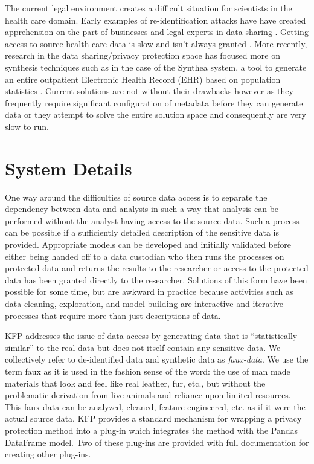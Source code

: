 \documentclass{article}
\begin{document}
The current legal environment creates a difficult situation for scientists in the health care domain. Early examples of re-identification attacks \cite{sweeney_2002} have have created apprehension on the part of businesses and legal experts in data sharing \cite{ohm_broken_2009}. Getting access to source health care data is slow and isn't always granted \cite{hodge_legal_1999, committee_hipaa_privacy_rule_2009}. More recently, research in the data sharing/privacy protection space has focused more on synthesis techniques such as in the case of the Synthea system, a tool to generate an entire outpatient Electronic Health Record (EHR) based on population statistics \cite{walonoski_synthea_2018}. Current solutions are not without their drawbacks however as they frequently require significant configuration of metadata before they can generate data or they attempt to solve the entire solution space and consequently are very slow to run.

\section{System Details}

One way around the difficulties of source data access is to separate the dependency between data and analysis in such a way that analysis can be performed without the analyst having access to the source data. Such a process can be possible if a sufficiently detailed description of the sensitive data is provided. Appropriate models can be developed and initially validated before either being handed off to a data custodian who then runs the processes on protected data and returns the results to the researcher or access to the protected data has been granted directly to the researcher. Solutions of this form have been possible for some time, but are awkward in practice because activities such as data cleaning, exploration, and model building are interactive and iterative processes that require more than just descriptions of data.

KFP addresses the issue of data access by generating data that is ``statistically similar'' to the real data but does not itself contain any sensitive data. We collectively refer to de-identified data and synthetic data as \emph{faux-data}. We use the term faux as it is used in the fashion sense of the word: the use of man made materials that look and feel like real leather, fur, etc., but without the problematic derivation from live animals and reliance upon limited resources. This faux-data can be analyzed, cleaned, feature-engineered, etc. as if it were the actual source data. KFP provides a standard mechanism for wrapping a privacy protection method into a plug-in which integrates the method with the Pandas DataFrame model. Two of these plug-ins are provided with full documentation for creating other plug-ins.
\end{document}
